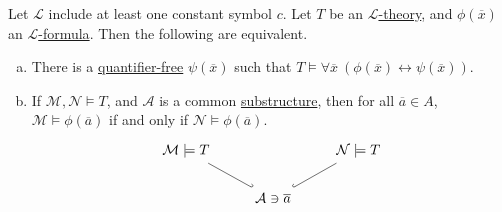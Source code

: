 \begin{theorem}\label{thm:QE-test}
	Let \(\mathcal{L} \) include at least one constant symbol \(c\). Let \(T\) be an \hyperref[def:theory]{\(\mathcal{L} \)-theory}, and \(\phi (\overline{x} )\) an \hyperref[def:formula]{\(\mathcal{L} \)-formula}. Then the following are equivalent.
	\begin{enumerate}[(a)]
		\item\label{thm:QE-test-a} There is a \hyperref[not:quantifier-free]{quantifier-free} \(\psi (\overline{x} )\) such that \(T \models \forall \overline{x} \ (\phi (\overline{x} ) \leftrightarrow \psi (\overline{x} ))\).
		\item\label{thm:QE-test-b} If \(\mathcal{M} , \mathcal{N} \models T\), and \(\mathcal{A} \) is a common \hyperref[def:substructure]{substructure}, then for all \(\overline{a} \in A\), \(\mathcal{M} \models \phi (\overline{a} )\) if and only if \(\mathcal{N} \models \phi (\overline{a} )\).
		\[\begin{tikzcd}
				{\mathcal{M} \models T} && {\mathcal{N} \models T} \\
				& {\mathcal{A}\ni \overline{a}}
				\arrow[hook, no head, from=2-2, to=1-3]
				\arrow[hook', no head, from=2-2, to=1-1]
			\end{tikzcd}\]
	\end{enumerate}
\end{theorem}
